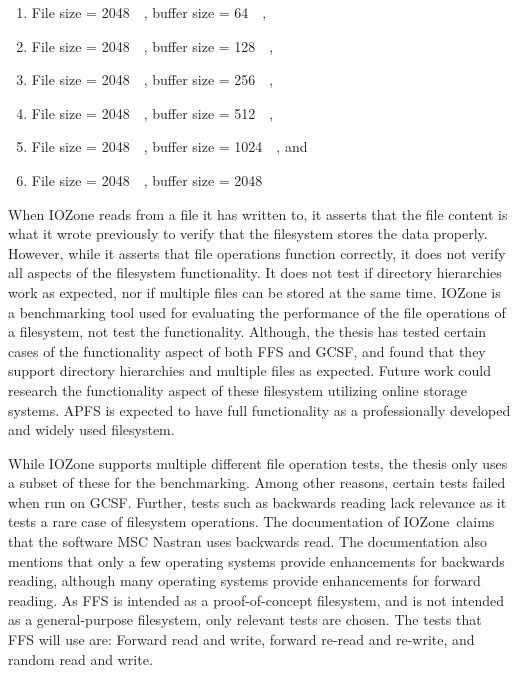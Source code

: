 \begin{enumerate}
\begin{enumerate}
	\item File size = \SI{2048}{\kilo\byte}, buffer size = \SI{64}{\kilo\byte},
	\item File size = \SI{2048}{\kilo\byte}, buffer size = \SI{128}{\kilo\byte},
	\item File size = \SI{2048}{\kilo\byte}, buffer size = \SI{256}{\kilo\byte},
	\item File size = \SI{2048}{\kilo\byte}, buffer size = \SI{512}{\kilo\byte},
	\item File size = \SI{2048}{\kilo\byte}, buffer size = \SI{1024}{\kilo\byte}, and
	\item File size = \SI{2048}{\kilo\byte}, buffer size = \SI{2048}{\kilo\byte}
\end{enumerate}

When IOZone reads from a file it has written to, it asserts that the file content is what it wrote previously to verify that the filesystem stores the data properly. However, while it asserts that file operations function correctly, it does not verify all aspects of the filesystem functionality. It does not test if directory hierarchies work as expected, nor if multiple files can be stored at the same time. IOZone is a benchmarking tool used for evaluating the performance of the file operations of a filesystem, not test the functionality. Although, the thesis has tested certain cases of the functionality aspect of both FFS and GCSF, and found that they support directory hierarchies and multiple files as expected. Future work could research the functionality aspect of these filesystem utilizing online storage systems. APFS is expected to have full functionality as a professionally developed and widely used filesystem.

While IOZone supports multiple different file operation tests, the thesis only uses a subset of these for the benchmarking. Among other reasons, certain tests failed when run on GCSF. Further, tests such as backwards reading lack relevance as it tests a rare case of filesystem operations. The documentation of IOZone\,\cite{iozoneIozoneFilesystemBenchmark} claims that the software MSC Nastran uses backwards read. The documentation also mentions that only a few operating systems provide enhancements for backwards reading, although many operating systems provide enhancements for forward reading. As FFS is intended as a proof-of-concept filesystem, and is not intended as a general-purpose filesystem, only relevant tests are chosen. The tests that FFS will use are: Forward read and write, forward re-read and re-write, and random read and write.


\end{enumerate}
